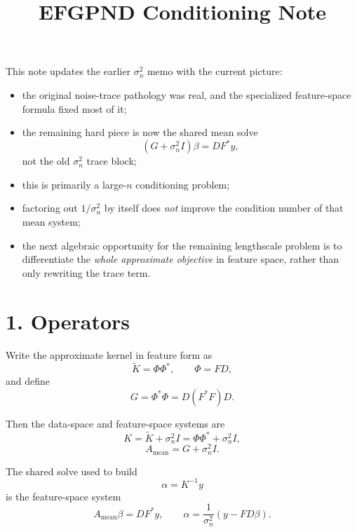 \documentclass[11pt]{article}
\title{EFGPND Conditioning Note}
\author{}
\date{}
\begin{document}
\maketitle

This note updates the earlier $\sigma_n^2$ memo with the current picture:
\begin{itemize}
  \item the original noise-trace pathology was real, and the specialized
  feature-space formula fixed most of it;
  \item the remaining hard piece is now the shared mean solve
  \[
    (G + \sigma_n^2 I)\beta = D F^\ast y,
  \]
  not the old $\sigma_n^2$ trace block;
  \item this is primarily a large-$n$ conditioning problem;
  \item factoring out $1/\sigma_n^2$ by itself does \emph{not} improve the
  condition number of that mean system;
  \item the next algebraic opportunity for the remaining lengthscale problem is
  to differentiate the \emph{whole approximate objective} in feature space,
  rather than only rewriting the trace term.
\end{itemize}

\section*{1. Operators}

Write the approximate kernel in feature form as
\begin{equation}
\widetilde K = \Phi \Phi^\ast,
\qquad
\Phi = F D,
\end{equation}
and define
\begin{equation}
G = \Phi^\ast \Phi = D(F^\ast F)D.
\end{equation}

Then the data-space and feature-space systems are
\begin{equation}
K = \widetilde K + \sigma_n^2 I
= \Phi \Phi^\ast + \sigma_n^2 I,
\end{equation}
\begin{equation}
A_{\mathrm{mean}} = G + \sigma_n^2 I.
\end{equation}

The shared solve used to build
\[
\alpha = K^{-1}y
\]
is the feature-space system
\begin{equation}
A_{\mathrm{mean}} \beta = D F^\ast y,
\qquad
\alpha = \frac{1}{\sigma_n^2}\left(y - F D \beta\right).
\end{equation}
\end{document}
